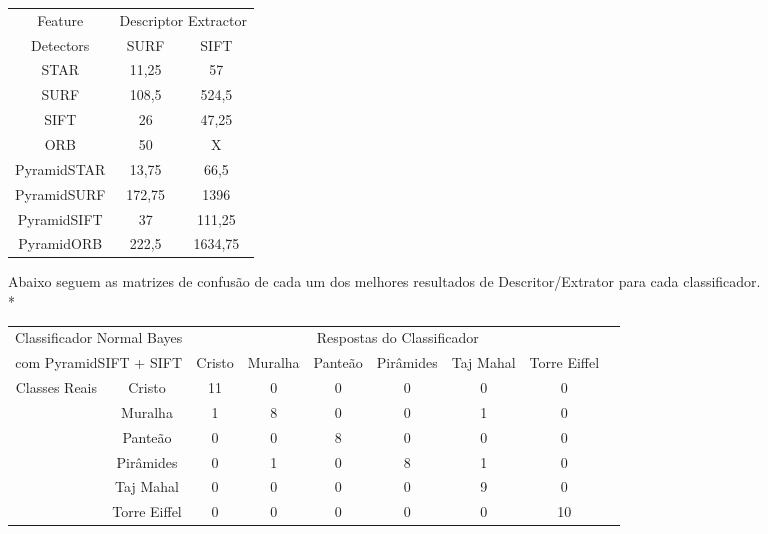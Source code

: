 \documentclass[a4paper,11pt]{article}
\begin{document}
\begin{tabular}{|c|c|c|}
    \hline
    Feature &  \multicolumn{2}{|c|}{Descriptor Extractor} \\
    \cline{2-3}
     Detectors & SURF & SIFT \\
    \hline
    STAR & 11,25 & 57 \\
    SURF & 108,5 & 524,5 \\
    SIFT  & 26 & 47,25 \\
    ORB  & 50 & X \\
    PyramidSTAR & 13,75 & 66,5 \\
    PyramidSURF & 172,75 & 1396 \\
    PyramidSIFT & 37 & 111,25 \\
    PyramidORB & 222,5 & 1634,75 \\
    \hline
  \end{tabular}
  \bigskip

Abaixo seguem as matrizes de confusão de cada um dos melhores resultados de Descritor/Extrator para cada classificador.\\*

  \hspace{-75pt}
  \begin{tabular}{|cc|c|c|c|c|c|c|c|}
    \hline
    \multicolumn{2}{|c|}{Classificador Normal Bayes} &
    \multicolumn{6}{|c|}{Respostas do Classificador} \\
    \cline{3-8}
    \multicolumn{2}{|c|}{com PyramidSIFT + SIFT}
    & Cristo & Muralha & Panteão & Pirâmides & Taj Mahal & Torre Eiffel \\
    \hline
    \multirow{6}{*}{Classes Reais}
    & \multicolumn{1}{|c|}{Cristo} & 11 & 0 & 0 & 0 & 0 & 0 \\
    \cline{2-8}
    & \multicolumn{1}{|c|}{Muralha} & 1 & 8 & 0 & 0 & 1 & 0\\
    \cline{2-8}
    & \multicolumn{1}{|c|}{Panteão} & 0 & 0 & 8 & 0 & 0 & 0\\
    \cline{2-8}
    & \multicolumn{1}{|c|}{Pirâmides} & 0 & 1 & 0 & 8 & 1 & 0\\
    \cline{2-8}
    & \multicolumn{1}{|c|}{Taj Mahal} & 0 & 0 & 0 & 0 & 9 & 0\\
    \cline{2-8}
    & \multicolumn{1}{|c|}{Torre Eiffel} & 0 & 0 & 0 & 0 & 0 & 10\\
    \hline
  \end{tabular}
  \bigskip
  
\end{document}
